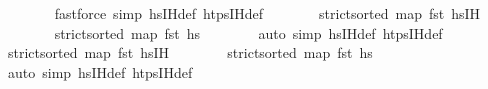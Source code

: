 \begin{isabellebody}
\ \ \ \ \ \ \isamarkupfalse%
\ {\isacharparenleft}{\kern0pt}fastforce\ simp{\isacharcolon}{\kern0pt}\ hs{\isacharprime}{\kern0pt}{\isacharunderscore}{\kern0pt}IH{\isacharunderscore}{\kern0pt}def\ htps{\isacharunderscore}{\kern0pt}IH{\isacharunderscore}{\kern0pt}def{\isacharparenright}{\kern0pt}\isanewline
\ \ \ \ \isamarkupfalse%
\ \isamarkupfalse%
\ {\isachardoublequoteopen}strict{\isacharunderscore}{\kern0pt}sorted\ {\isacharparenleft}{\kern0pt}map\ fst\ {\isacharparenleft}{\kern0pt}hs{\isacharunderscore}{\kern0pt}IH{\isacharparenright}{\kern0pt}{\isacharparenright}{\kern0pt}{\isachardoublequoteclose}\isanewline
\ \ \ \ \ \ \isamarkupfalse%
\ {\isacartoucheopen}strict{\isacharunderscore}{\kern0pt}sorted\ {\isacharparenleft}{\kern0pt}map\ fst\ hs{\isacharparenright}{\kern0pt}{\isacartoucheclose}\isanewline
\ \ \ \ \ \ \isamarkupfalse%
\ {\isacharparenleft}{\kern0pt}auto\ simp{\isacharcolon}{\kern0pt}\ hs{\isacharunderscore}{\kern0pt}IH{\isacharunderscore}{\kern0pt}def\ htps{\isacharunderscore}{\kern0pt}IH{\isacharunderscore}{\kern0pt}def{\isacharparenright}{\kern0pt}\isanewline
\ \ \ \ \isamarkupfalse%
\ \isamarkupfalse%
\ {\isachardoublequoteopen}strict{\isacharunderscore}{\kern0pt}sorted\ {\isacharparenleft}{\kern0pt}map\ fst\ {\isacharparenleft}{\kern0pt}hs{\isacharprime}{\kern0pt}{\isacharunderscore}{\kern0pt}IH{\isacharparenright}{\kern0pt}{\isacharparenright}{\kern0pt}{\isachardoublequoteclose}\isanewline
\ \ \ \ \ \ \isamarkupfalse%
\ {\isacartoucheopen}strict{\isacharunderscore}{\kern0pt}sorted\ {\isacharparenleft}{\kern0pt}map\ fst\ hs{\isacharprime}{\kern0pt}{\isacharparenright}{\kern0pt}{\isacartoucheclose}\isanewline
\ \ \ \ \ \ \isamarkupfalse%
\ {\isacharparenleft}{\kern0pt}auto\ simp{\isacharcolon}{\kern0pt}\ hs{\isacharprime}{\kern0pt}{\isacharunderscore}{\kern0pt}IH{\isacharunderscore}{\kern0pt}def\ htps{\isacharunderscore}{\kern0pt}IH{\isacharunderscore}{\kern0pt}def{\isacharparenright}{\kern0pt}\isanewline
\ \ \ \ \isamarkupfalse%
\ \isamarkupfalse%
\isanewline

\end{isabellebody}
